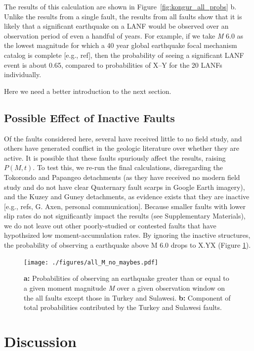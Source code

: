 \documentclass[twocolumn,grl]{AGUTeX}
\begin{document}
\begin{article}
The results of this calculation are shown in
Figure~\ref{fig:kongur_all_probs} b.  Unlike the results from a single
fault, the results from all faults show that it is likely that a
significant earthquake on a LANF would be observed over an observation
period of even a handful of years.  For example, if we take \emph{M}
6.0 as the lowest magnitude for which a 40 year global earthquake
focal mechanism catalog is complete [e.g., ref], then the probability
of seeing a significant LANF event is about 0.65, compared to
probabilities of X--Y for the 20 LANFs individually.

Here we need a better introduction to the next section.

\subsection{Possible Effect of Inactive Faults}

Of the faults considered here, several have received little to no
field study, and others have generated conflict in the geologic
literature over whether they are active.  It is possible that these
faults spuriously affect the results, raising $P(M,t)$.  To test this,
we re-run the final calculations, disregarding the Tokorondo and
Papangeo detachments (as they have received no modern field study and
do not have clear Quaternary fault scarps in Google Earth imagery),
and the Kuzey and Guney detachments, as evidence exists that they are
inactive [e.g., refs, G. Axen, personal communication].  Because
smaller faults with lower slip rates do not significantly impact the
results (see Supplementary Materials), we do not leave out other
poorly-studied or contested faults that have hypothsized low
moment-accumulation rates. By ignoring the inactive structures, the
probability of observing a earthquake above M 6.0 drops to X.YX
(Figure \ref{fig:all_probs_no_maybes}).



\begin{figure}%
\noindent\texttt{[image: ./figures/all\_M\_no\_maybes.pdf]}
\caption{\textbf{a:} Probabilities of observing an earthquake greater than or equal to a given moment magnitude \emph{M} over a given observation window on the all faults except those in Turkey and Sulawesi. \textbf{b:} Component of total probabilities contributed by the Turkey and Sulawesi faults.}
\label{fig:all_probs_no_maybes}
\end{figure}


\section{Discussion}


\end{article}
\end{document}
